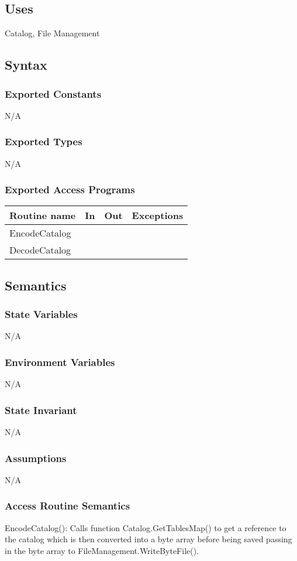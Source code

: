 \documentclass[12pt]{article}
\begin{document}
\subsection{Uses}
Catalog, File Management

\subsection{Syntax}
\subsubsection{Exported Constants}
N/A

\subsubsection{Exported Types}
N/A

\subsubsection{Exported Access Programs}
\begin{tabular}{| l | l | l | l |}
\hline
\textbf{Routine name} & \textbf{In} & \textbf{Out} & \textbf{Exceptions}\\
\hline
EncodeCatalog & & & \\
DecodeCatalog & & & \\
\hline
\end{tabular}

\subsection{Semantics}
\subsubsection{State Variables}
N/A
\subsubsection{Environment Variables}
N/A
\subsubsection{State Invariant}
N/A
\subsubsection{Assumptions}
N/A

\subsubsection{Access Routine Semantics}
\noindent EncodeCatalog(): Calls function Catalog.GetTablesMap() to get a reference to the catalog which is then converted into a byte array before being saved passing in the byte array to FileManagement.WriteByteFile().\\
\end{document}
